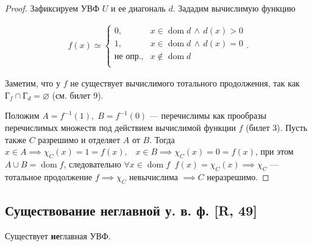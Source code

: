 \documentclass[a4paper, fleqn]{article}
\DeclareMathOperator{\dom}{\mathop{\mathrm{dom}}}
\newcommand{\void}{\varnothing} %
\newcommand{\udv}{\text{не опр.}} %
\newcommand{\plot}{\text{Г}} %
\begin{document}
        \begin{proof}
        Зафиксируем УВФ $U$ и ее диагональ $d$. Зададим вычислимую функцию

        \begin{equation*}
        \begin{gathered}
        f(x) \simeq
        \begin{cases}
        0, & x \in \dom d \,\wedge\, d(x) > 0 \\
        1, & x \in \dom d \,\wedge\, d(x) = 0 \\
        \udv, & x \notin \dom d \\
        \end{cases}.
        \end{gathered}
        \end{equation*}

        Заметим, что у $f$ не существует вычислимого тотального продолжения, так как $\plot_f \cap \plot_d = \void$ (см. билет 9).

        Положим $A = f^{-1}(1), \; B = f^{-1}(0)$ --- перечислимы как прообразы перечислимых множеств под действием вычислимой функции $f$ (билет 3). Пусть также $C$ разрешимо и отделяет $A$ от $B$. Тогда $x \in A \implies \chi_C(x) = 1 = f(x), \;\;\; x \in B \implies \chi_C(x) = 0 = f(x)$, при этом $A \cup B = \dom f$, следовательно $\forall x \in \dom f \;\; f(x) = \chi_C(x) \implies \chi_C$ --- тотальное продолжение $f \implies \chi_C$ невычислима $\implies C$ неразрешимо.
        \end{proof}

    \subsection{Существование неглавной у. в. ф. [R, 49]}

        \begin{proposition}
            Существует \textbf{не}главная УВФ.
        \end{proposition}
\end{document}
